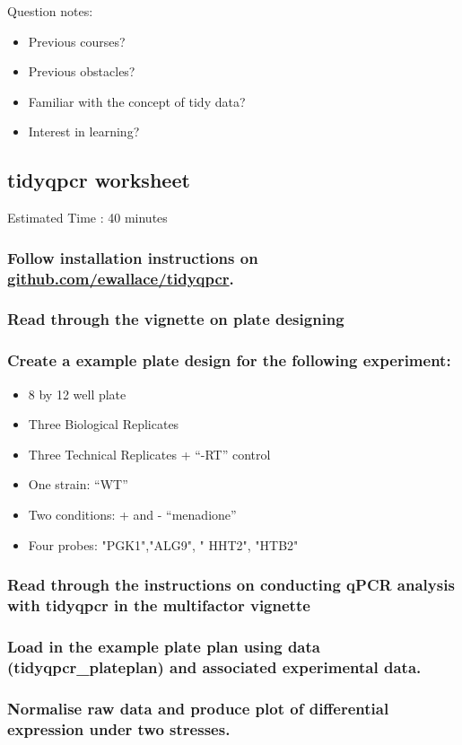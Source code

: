 \documentclass[../main.tex]{subfiles}
\begin{document}
Question notes:
\begin{itemize}
    \item Previous courses?
    \item Previous obstacles?
    \item Familiar with the concept of tidy data?
    \item Interest in learning?
\end{itemize}

\subsection{tidyqpcr worksheet}
Estimated Time : 40 minutes

\subsubsection{Follow installation instructions on \href{https://github.com/ewallace/tidyqpcr}{github.com/ewallace/tidyqpcr}.}

\subsubsection{Read through the vignette on plate designing}

\subsubsection{Create a example plate design for the following experiment:}
\begin{itemize}
    \item 8 by 12 well plate
    \item Three Biological Replicates
    \item Three Technical Replicates + “-RT” control
    \item One strain: “WT”
    \item Two conditions: + and - “menadione”
    \item Four probes: "PGK1","ALG9", " HHT2", "HTB2"
\end{itemize}

\subsubsection{Read through the instructions on conducting qPCR analysis with tidyqpcr in the multifactor vignette}

\subsubsection{Load in the example plate plan using data (tidyqpcr\_plateplan) and associated experimental data.}

\subsubsection{Normalise raw data and produce plot of differential expression under two stresses.}
\end{document}

